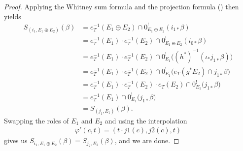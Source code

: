 \begin{proof}
  Applying the Whitney sum formula and the projection formula (\cite[\S 3.6]{kresch_CycleGroupsArtin1999}) then yields
  \begin{align*}
    S_{(i_1, E_1\oplus E_2)}(\beta) &= e^{-1}_T(E_1\oplus E_2) \cap 0^!_{E_1\oplus E_2}(i_{1*}\beta) \\
    &= e^{-1}_T(E_1)\cdot e_T^{-1}(E_2) \cap 0^!_{E_1\oplus E_2}(i_{0*}\beta) \\
    &= e^{-1}_T(E_1)\cdot e_T^{-1}(E_2) \cap 0^!_{E_1}\big((h^*)^{-1}(\iota_*j_{1*}\beta)\big) \\
    &= e^{-1}_T(E_1)\cdot e_T^{-1}(E_2) \cap 0^!_{E_1}\big(e_T(g^*E_2) \cap j_{1*}\beta\big) \\
    &= e^{-1}_T(E_1)\cdot e_T^{-1}(E_2)\cdot e_T(E_2) \cap 0^!_{E_1}\big(j_{1*}\beta\big) \\
    &= e_T^{-1}(E_1) \cap 0^!_{E_1}\big(j_{1*}\beta \big) \\
    &= S_{(j_1, E_1)}(\beta).
  \end{align*}
  Swapping the roles of \(E_1\) and \(E_2\) and using the interpolation
  \begin{align*}
    \varphi'(c,t) = (t·j1(c), j2(c), t)
  \end{align*}
  gives us \(S_{i_1, E_1\oplus E_2}(\beta) = S_{j_2, E_2}(\beta)\), and we are done.
\end{proof}
